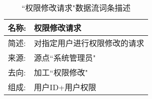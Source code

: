 \begin{table}[H]  
\caption{``权限修改请求"数据流词条描述}  
\begin{center}  
    \begin{tabular}{l p{11cm}} 
        \hline
        \quad 名称:  &   权限修改请求 \\
        \hline
        \quad 简述:  & 对指定用户进行权限修改的请求 \\
        \hline
        \quad 来源:  & 源点``系统管理员"\\
        \hline
        \quad 去向:  & 加工``权限修改" \\
        \hline
        \quad 组成:  & 用户ID+用户权限\\
        \hline
    \end{tabular}
    \label{tab1}
\end{center}
\end{table}


